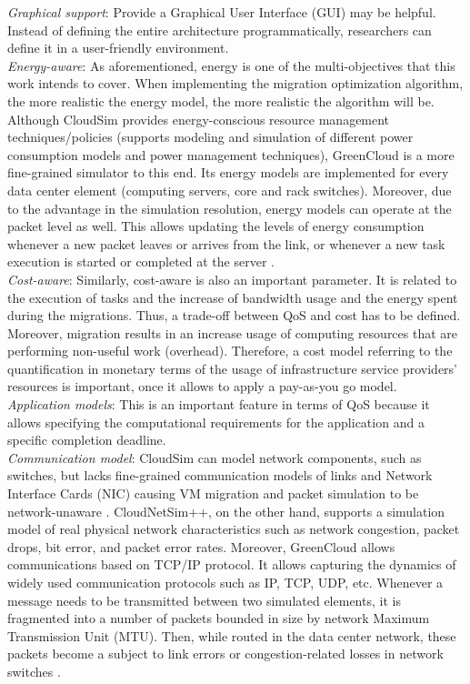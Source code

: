 \noindent\tab \textit{Graphical support}: Provide a Graphical User Interface (GUI) may be helpful. Instead of defining the entire architecture programmatically, researchers can define it in a user-friendly environment.\\
\noindent\tab \textit{Energy-aware}: As aforementioned, energy is one of the multi-objectives that this work intends to cover. When implementing the migration optimization algorithm, the more realistic the energy model, the more realistic the algorithm will be. Although CloudSim provides energy-conscious resource management techniques/policies (supports modeling and simulation of different power consumption models and power management techniques), GreenCloud is a more fine-grained simulator to this end. Its energy models are implemented for every data center element (computing servers, core and rack switches). Moreover, due to the advantage in the simulation resolution, energy models can operate at the packet level as well. This allows updating the levels of energy consumption whenever a new packet leaves or arrives from the link, or whenever a new task execution is started or completed at the server \cite{kliazovich2012greencloud}.\\
\noindent\tab \textit{Cost-aware}: Similarly, cost-aware is also an important parameter. It is related to the execution of tasks and the increase of bandwidth usage and the energy spent during the migrations. Thus, a trade-off between QoS and cost has to be defined. Moreover, migration results in an increase usage of computing resources that are performing non-useful work (overhead). Therefore, a cost model referring to the quantification in monetary terms of the usage of infrastructure service providers' resources is important, once it allows to apply a pay-as-you go model.\\
\noindent\tab \textit{Application models}: This is an important feature in terms of QoS because it allows specifying the computational requirements for the application and a specific completion deadline.\\
\noindent\tab \textit{Communication model}: CloudSim can model network components, such as switches, but lacks fine-grained communication models of links and Network Interface Cards (NIC) causing VM migration and packet simulation to be network-unaware \cite{malik2017cloudnetsim++}. CloudNetSim++, on the other hand, supports a simulation model of real physical network characteristics such as network congestion, packet drops, bit error, and packet error rates. Moreover, GreenCloud allows communications based on TCP/IP protocol. It allows capturing the dynamics of widely used communication protocols such as IP, TCP, UDP, etc. Whenever a message needs to be transmitted between two simulated elements, it is fragmented into a number of packets bounded in size by network Maximum Transmission Unit (MTU). Then, while routed in the data center network, these packets become a subject to link errors or congestion-related losses in network switches \cite{kliazovich2012greencloud}.\\
